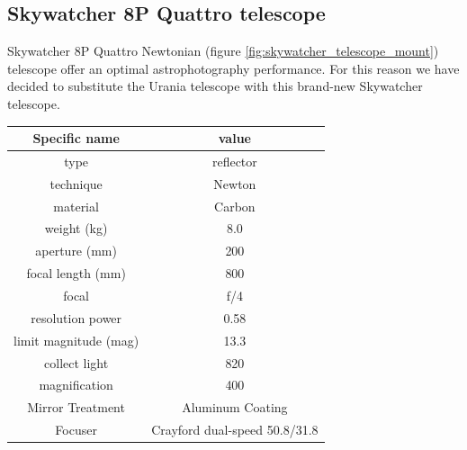 \documentclass{article}
\begin{document}
\begin{multicols}{2}
        \subsection{Skywatcher 8P Quattro telescope}
        Skywatcher 8P Quattro Newtonian (figure \ref{fig:skywatcher_telescope_mount}) telescope offer an optimal astrophotography performance.
        For this reason we have decided to substitute the Urania telescope with this brand-new Skywatcher telescope.
        \\
        \begin{minipage}{0.5\textwidth}
            \centering
            \begin{tabular}{c|c}
                Specific name & value \\
                \hline
                type & reflector \\
                technique & Newton  \\
                material & Carbon  \\
                weight (kg) & 8.0 \\
                aperture (mm) & 200 \\
                focal length (mm) & 800 \\
                focal & f/4 \\
                resolution power & 0.58 \\
                limit magnitude (mag) & 13.3 \\
                collect light & 820 \\
                magnification & 400 \\
                Mirror Treatment & Aluminum Coating \\
                Focuser & Crayford dual-speed 50.8/31.8 \\
                \hline
            \end{tabular}
        \end{minipage}
        \\
        \\
        \begin{minipage}{0.5\textwidth}
            \centering

\end{minipage}
\end{multicols}
\end{document}

